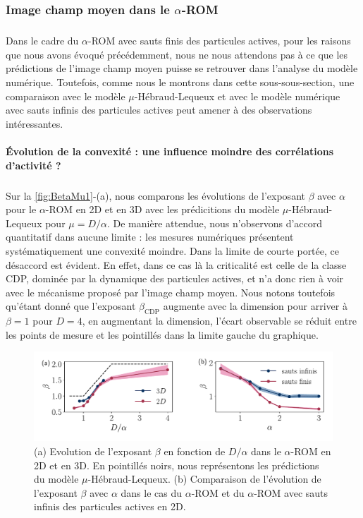\subsubsection{Image champ moyen dans le $\alpha$-ROM}

\subparagraph{}Dans le cadre du $\alpha$-ROM avec sauts finis des particules actives, pour les raisons que nous avons évoqué précédemment, nous ne nous attendons pas à ce que les prédictions de l'image champ moyen puisse se retrouver dans l'analyse du modèle numérique. Toutefois, comme nous le montrons dans cette sous-sous-section, une comparaison avec le modèle $\mu$-Hébraud-Lequeux et avec le modèle numérique avec sauts infinis des particules actives peut amener à des observations intéressantes.

\paragraph{Évolution de la convexité : une influence moindre des corrélations d'activité ?}

\subparagraph{}Sur la \autoref{fig:BetaMu1}-(a), nous comparons les évolutions de l'exposant $\beta$ avec $\alpha$ pour le $\alpha$-ROM en 2D et en 3D avec les prédicitions du modèle $\mu$-Hébraud-Lequeux pour $\mu = D/\alpha$. De manière attendue, nous n'observons d'accord quantitatif dans aucune limite : les mesures numériques présentent systématiquement une convexité moindre. Dans la limite de courte portée, ce désaccord est évident. En effet, dans ce cas là la criticalité est celle de la classe CDP, dominée par la dynamique des particules actives, et n'a donc rien à voir avec le mécanisme proposé par l'image champ moyen. Nous notons toutefois qu'étant donné que l'exposant $\beta_\text{CDP}$ augmente avec la dimension pour arriver à $\beta = 1$ pour $D=4$, en augmentant la dimension, l'écart observable se réduit entre les points de mesure et les pointillés dans la limite gauche du graphique.

\begin{figure}[h]
	\centering
	\includegraphics[width = \textwidth]{Chapitre3/Figures/Interpretation/Beta_Mu1.pdf}
	\caption{(a) Evolution de l'exposant $\beta$ en fonction de $D/\alpha$ dans le $\alpha$-ROM en 2D et en 3D. En pointillés noirs, nous représentons les prédictions du modèle $\mu$-Hébraud-Lequeux. (b) Comparaison de l'évolution de l'exposant $\beta$ avec $\alpha$ dans le cas du $\alpha$-ROM et du $\alpha$-ROM avec sauts infinis des particules actives en 2D.}
	\label{fig:BetaMu1}
\end{figure}


